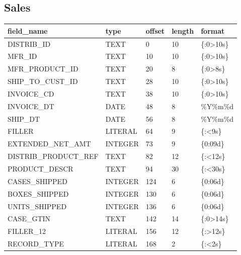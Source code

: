 \documentclass[letterpaper,10pt,english]{sphinxmanual}
\begin{document}
\subsection{Sales}
\label{\detokenize{cds_record_layout:sales}}

\begin{savenotes}\sphinxattablestart
\centering
\begin{tabulary}{\linewidth}[t]{|T|T|T|T|T|}
\hline
\sphinxstyletheadfamily 
field\_name
&\sphinxstyletheadfamily 
type
&\sphinxstyletheadfamily 
offset
&\sphinxstyletheadfamily 
length
&\sphinxstyletheadfamily 
format
\\
\hline
DISTRIB\_ID
&
TEXT
&
0
&
10
&
\{:0\textgreater{}10s\}
\\
\hline
MFR\_ID
&
TEXT
&
10
&
10
&
\{:0\textgreater{}10s\}
\\
\hline
MFR\_PRODUCT\_ID
&
TEXT
&
20
&
8
&
\{:0\textgreater{}8s\}
\\
\hline
SHIP\_TO\_CUST\_ID
&
TEXT
&
28
&
10
&
\{:0\textgreater{}10s\}
\\
\hline
INVOICE\_CD
&
TEXT
&
38
&
10
&
\{:0\textgreater{}10s\}
\\
\hline
INVOICE\_DT
&
DATE
&
48
&
8
&
\%Y\%m\%d
\\
\hline
SHIP\_DT
&
DATE
&
56
&
8
&
\%Y\%m\%d
\\
\hline
FILLER
&
LITERAL
&
64
&
9
&
\{:\textless{}9s\}
\\
\hline
EXTENDED\_NET\_AMT
&
INTEGER
&
73
&
9
&
\{0:09d\}
\\
\hline
DISTRIB\_PRODUCT\_REF
&
TEXT
&
82
&
12
&
\{:\textless{}12s\}
\\
\hline
PRODUCT\_DESCR
&
TEXT
&
94
&
30
&
\{:\textless{}30s\}
\\
\hline
CASES\_SHIPPED
&
INTEGER
&
124
&
6
&
\{0:06d\}
\\
\hline
BOXES\_SHIPPED
&
INTEGER
&
130
&
6
&
\{0:06d\}
\\
\hline
UNITS\_SHIPPED
&
INTEGER
&
136
&
6
&
\{0:06d\}
\\
\hline
CASE\_GTIN
&
TEXT
&
142
&
14
&
\{:0\textgreater{}14s\}
\\
\hline
FILLER\_12
&
LITERAL
&
156
&
12
&
\{:\textgreater{}12s\}
\\
\hline
RECORD\_TYPE
&
LITERAL
&
168
&
2
&
\{:\textless{}2s\}
\\
\hline
\end{tabulary}
\par
\sphinxattableend\end{savenotes}
\end{document}
